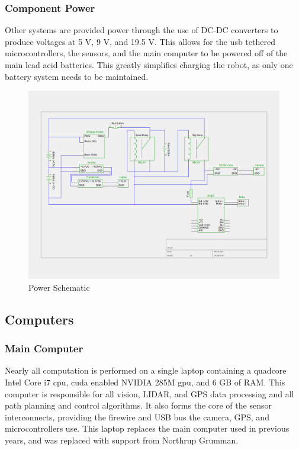 \subsubsection{Component Power}

Other systems are provided power through the use of DC-DC converters to produce voltages at 5 V, 9 V, and 19.5 V. This allows for the usb tethered microcontrollers, the sensors, and the main computer to be powered off of the main lead acid batteries. This greatly simplifies charging the robot, as only one battery system needs to be maintained.

\begin{figure}[H]
\begin{center}
\includegraphics[width=6in]{./igvc_power.png}
\caption{Power Schematic}
\label{FIG:Power}
\end{center}
\end{figure}

\subsection{Computers}

\subsubsection{Main Computer}

Nearly all computation is performed on a single laptop containing a quadcore Intel Core i7 cpu, cuda enabled NVIDIA 285M gpu, and 6 GB of RAM. This computer is responsible for all vision, LIDAR, and GPS data processing and all path planning and control algorithms. It also forms the core of the sensor interconnects, providing the firewire and USB bus the camera, GPS, and microcontrollers use. This laptop replaces the main computer used in previous years, and was replaced with support from Northrup Grumman.

